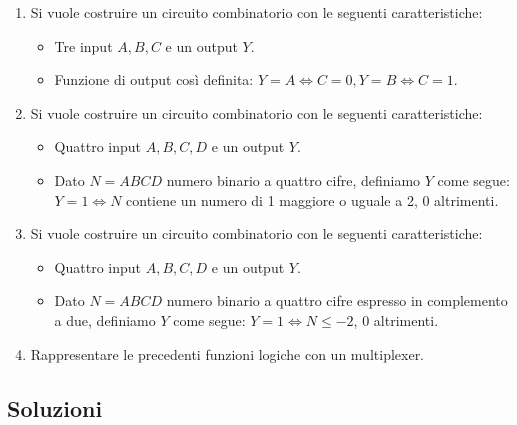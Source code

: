 \documentclass[tikz, border=2mm]{article}
\begin{document}
\begin{enumerate}
    \item Si vuole costruire un circuito combinatorio con le seguenti caratteristiche:
    \begin{itemize}
        \item Tre input $A,B,C$ e un output $Y$.
        \item Funzione di output così definita: $Y=A \iff C=0, Y=B \iff C=1$.
    \end{itemize}
    
    \item Si vuole costruire un circuito combinatorio con le seguenti caratteristiche:
    \begin{itemize}
        \item Quattro input $A,B,C,D$ e un output $Y$.
        \item Dato $N=ABCD$ numero binario a quattro cifre, definiamo $Y$ come segue: $Y=1  \iff N$ contiene un numero di 1 maggiore o uguale a 2, 0 altrimenti.
    \end{itemize}

    \newpage
    \item Si vuole costruire un circuito combinatorio con le seguenti caratteristiche:
    \begin{itemize}
        \item Quattro input $A,B,C,D$ e un output $Y$.
        \item Dato $N=ABCD$ numero binario a quattro cifre espresso in complemento a due, definiamo $Y$ come segue: $Y=1  \iff N\leq-2$, 0 altrimenti.
    \end{itemize}
    
    \item Rappresentare le precedenti funzioni logiche con un multiplexer.
\end{enumerate}

\subsection{Soluzioni}
\end{document}

